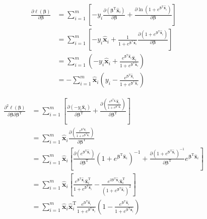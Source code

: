\documentclass{ctexart}
\begin{document}
	\begin{equation}
		\begin{aligned}
			\frac{\partial\ell(\bm{\beta})}{\partial\bm{\beta}}&=\sum_{i=1}^m\left[-y_i\frac{\partial\left(\bm{\beta}^{\mathrm{T}}\hat{\bm{x}}_i\right)}{\partial\bm{\beta}}+\frac{\partial\ln\left(1+e^{\bm{\beta}^\mathrm{T}\hat{\bm{x}}_i}\right)}{\partial\bm{\beta}}\right]\\
			&=\sum_{i=1}^m\left[-y_i\hat{\bm{x}}_i+\frac{1}{1+e^{\bm{\beta}^\mathrm{T}\hat{\bm{x}}_i}}\frac{\partial(1+e^{\bm{\beta}^\mathrm{T}\hat{\bm{x}}_i})}{\partial\bm{\beta}}\right]\\
			&=\sum_{i=1}^m\left(-y_i\hat{\bm{x}}_i+\frac{e^{\bm{\beta}^\mathrm{T}\hat{\bm{x}}_i}\hat{\bm{x}}_i}{1+e^{\bm{\beta}^\mathrm{T}\hat{\bm{x}}_i}}\right)\\
			&=-\sum_{i=1}^m\hat{\bm{x}}_i\left(y_i-\frac{e^{\bm{\beta}^\mathrm{T}\hat{\bm{x}}_i}}{1+e^{\bm{\beta}^\mathrm{T}\hat{\bm{x}}_i}}\right)
		\end{aligned}
		\label{One_ell}
	\end{equation}

	\begin{equation}
		\begin{aligned}
			\frac{\partial^2\ell(\bm{\beta})}{\partial\bm{\beta}\partial\bm{\beta}^\mathrm{T}}&=\sum_{i=1}^m\left[\frac{\partial\left(-y_i\hat{\bm{x}}_i\right)}{\partial\bm{\beta}^\mathrm{T}}+\frac{\partial\left(\frac{e^{\bm{\beta}^\mathrm{T}\hat{\bm{x}}_i}\hat{\bm{x}}_i}{1+e^{\bm{\beta}^\mathrm{T}\hat{\bm{x}}_i}}\right)}{\partial\bm{\beta}^\mathrm{T}}\right]\\
			&=\sum_{i=1}^m\hat{\bm{x}}_i\frac{\partial\left(\frac{e^{\bm{\beta}^\mathrm{T}\hat{\bm{x}}_i}}{1+e^{\bm{\beta}^\mathrm{T}\hat{\bm{x}}_i}}\right)}{\partial\bm{\beta}^\mathrm{T}}\\
			&=\sum_{i=1}^m\hat{\bm{x}}_i\left[\frac{\partial\left(e^{\bm{\beta}^\mathrm{T}\hat{\bm{x}}_i}\right)}{\partial\bm{\beta}^\mathrm{T}}\left(1+e^{\bm{\beta}^\mathrm{T}\hat{\bm{x}}_i}\right)^{-1}+\frac{\partial\left(1+e^{\bm{\beta}^\mathrm{T}\hat{\bm{x}}_i}\right)^{-1}}{\partial\bm{\beta}^\mathrm{T}}e^{\bm{\beta}^\mathrm{T}\hat{\bm{x}}_i}\right]\\
			&=\sum_{i=1}^m\hat{\bm{x}}_i\left[\frac{e^{\bm{\beta}^\mathrm{T}\hat{\bm{x}}_i}\hat{\bm{x}}_i^\mathrm{T}}{1+e^{\bm{\beta}^\mathrm{T}\hat{\bm{x}}_i}}-\frac{e^{2\bm{\beta}^\mathrm{T}\hat{\bm{x}}_i}\hat{\bm{x}}_i^\mathrm{T}}{(1+e^{\bm{\beta}^\mathrm{T}\hat{\bm{x}}_i})^2}\right]\\
			&=\sum_{i=1}^m\hat{\bm{x}}_i\hat{\bm{x}}_i^\mathrm{T}\frac{e^{\bm{\beta}^\mathrm{T}\hat{\bm{x}}_i}}{1+e^{\bm{\beta}^\mathrm{T}\hat{\bm{x}}_i}}\left(1-\frac{e^{\bm{\beta}^\mathrm{T}\hat{\bm{x}}_i}}{1+e^{\bm{\beta}^\mathrm{T}\hat{\bm{x}}_i}}\right)
		\end{aligned}
		\label{Two_ell}
	\end{equation}
\end{document}
